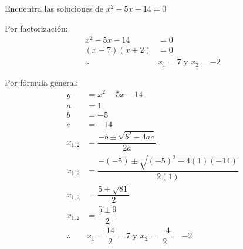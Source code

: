 Encuentra las soluciones de $x^2-5x-14=0$

\begin{solutionbox}{12cm}
    \begin{multicols}{2}
        Por factorización:
        \begin{align*}
            x^2-5x-14  & = 0                       \\
            (x-7)(x+2) & = 0                       \\
            \therefore & x_1 =7 \text{ y } x_2 =-2
        \end{align*}

        \columnbreak

        Por fórmula general:
        \begin{align*}
            y          & =	      x^2-5x-14
            \\
            a          & =1
            \\
            b          & =-5
            \\
            c          & =-14
            \\
            x_{1,2}    & = \dfrac{-b\pm\sqrt{b^2-4ac}}{2a}
            \\[2em]
            x_{1,2}    & = \dfrac{-(-5)\pm\sqrt{(-5)^2-4(1)(-14)}}{2(1)}
            \\[2em]
            x_{1,2}    & = \dfrac{5\pm\sqrt{81}}{2}
            \\[2em]
            x_{1,2}    & = \dfrac{5\pm 9}{2}
            \\[2em]
            \therefore & x_1 =\dfrac{14}{2}=7 \text{ y }  x_2
            =\dfrac{-4}{2}=-2                                            \\[2em]
        \end{align*}
    \end{multicols}
\end{solutionbox}

